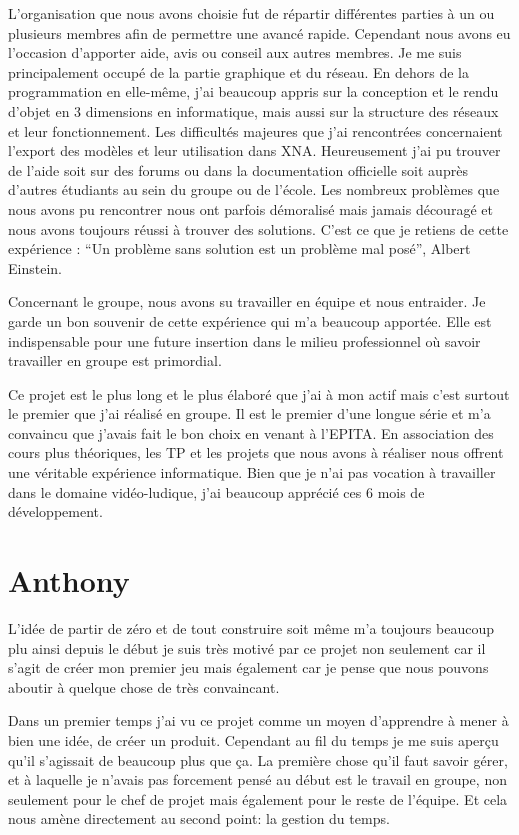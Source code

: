 \documentclass[11pt]{report}
\begin{document}
L’organisation que nous avons choisie fut de répartir différentes parties à un ou plusieurs membres afin de permettre une avancé rapide. Cependant nous avons eu l’occasion d’apporter aide, avis ou conseil aux autres membres.  Je me suis principalement occupé de la partie graphique et du réseau. En dehors de la programmation en elle-même, j’ai beaucoup appris sur la conception et le rendu d’objet en 3 dimensions en informatique, mais aussi sur la structure des réseaux et leur fonctionnement. Les difficultés majeures que j’ai rencontrées concernaient l’export des modèles et leur utilisation dans XNA. Heureusement j’ai pu trouver de l’aide soit sur des forums ou dans la documentation officielle soit auprès d’autres étudiants au sein du groupe ou de l’école. Les nombreux problèmes que nous avons pu rencontrer nous ont parfois démoralisé mais jamais découragé et nous avons toujours réussi à trouver des solutions. C’est ce que je retiens de cette expérience : ``Un problème sans solution est un problème mal posé'', Albert Einstein.

Concernant le groupe, nous avons su travailler en équipe et nous entraider. Je garde un bon souvenir de cette expérience qui m’a beaucoup apportée. Elle est indispensable pour une future insertion dans le milieu professionnel où savoir travailler en groupe est primordial.

Ce projet est le plus long et le plus élaboré que j’ai à mon actif mais c’est surtout le premier que j’ai réalisé en groupe. Il est le premier d’une longue série et m’a convaincu que j’avais fait le bon choix en venant à l’EPITA. En association des cours plus théoriques, les TP et les projets que nous avons à réaliser nous offrent une véritable expérience informatique. Bien que je n’ai pas vocation à travailler dans le domaine vidéo-ludique, j’ai beaucoup apprécié ces 6 mois de développement.

\section{Anthony}

L'idée de partir de zéro et de tout construire soit même m'a toujours beaucoup plu ainsi depuis le début je suis très motivé par ce projet non seulement car il s'agit de créer mon premier jeu mais également car je pense que nous pouvons aboutir à quelque chose de très convaincant.

Dans un premier temps j'ai vu ce projet comme un moyen d'apprendre à mener à bien une idée, de créer un produit. Cependant au fil du temps je me suis aperçu qu'il s'agissait de beaucoup plus que ça. La première chose qu'il faut savoir gérer, et à laquelle je n'avais pas forcement pensé au début est le travail en groupe, non seulement pour le chef de projet mais également pour le reste de l'équipe. Et cela nous amène directement au second point: la gestion du temps.
\end{document}
